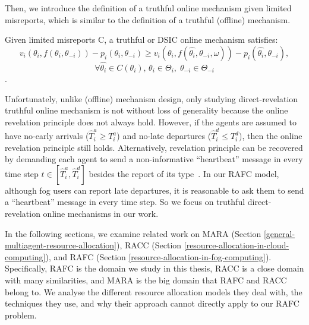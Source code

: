 \documentclass[11pt]{phdthesis}
\begin{document}
Then, we introduce the definition of a truthful online mechanism given limited misreports, which is similar to the definition of a truthful (offline) mechanism.

\begin{definition}[truthful]
    Given limited misreports C, a truthful or DSIC online mechanism satisfies:
    \[ v_i(\theta_i,f(\theta_i,\theta_{-i})) - p_i(\theta_i,\theta_{-i}) \geq v_i(\theta_i,f(\hat{\theta_i},\theta_{-i},\omega)) - p_i(\hat{\theta_i},\theta_{-i}), \]
    \[ \forall \hat{\theta_i} \in C(\theta_i), \, \theta_i \in \Theta_i, \;  \theta_{-i} \in \Theta_{-i} \]
    \citep[Definition 16.5]{nisan2007algorithmic}.
\end{definition}


Unfortunately, unlike (offline) mechanism design, only studying direct-revelation truthful online mechanism is not without loss of generality because the online revelation principle does not always hold. However, if the agents are assumed to have no-early arrivals ($ \hat{T}_i^a \geq T_i^a $) and no-late departures ($ \hat{T}_i^d \leq T_i^d $), then the online revelation principle still holds. Alternatively, revelation principle can be recovered by demanding each agent to send a non-informative ``heartbeat'' message in every time step $ t \in [\hat{T}_i^a, \hat{T}_i^d ] $ besides the report of its type~\citep[Section 16.22]{nisan2007algorithmic}. In our RAFC model, although fog users can report late departures, it is reasonable to ask them to send a ``heartbeat'' message in every time step. So we focus on truthful direct-revelation online mechanisms in our work. 

In the following sections, we examine related work on MARA (Section \ref{general-multiagent-resource-allocation}), RACC (Section \ref{resource-allocation-in-cloud-computing}), and RAFC (Section \ref{resource-allocation-in-fog-computing}). Specifically, RAFC is the domain we study in this thesis, RACC is a close domain with many similarities, and MARA is the big domain that RAFC and RACC belong to. We analyse the different resource allocation models they deal with, the techniques they use, and why their approach cannot directly apply to our RAFC problem.
\end{document}
